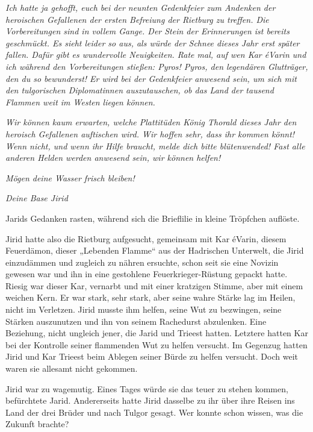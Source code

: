 \textit{Ich hatte ja gehofft, euch bei der neunten Gedenkfeier zum Andenken der heroischen Gefallenen der ersten Befreiung der Rietburg zu treffen. Die Vorbereitungen sind in vollem Gange. Der Stein der Erinnerungen ist bereits geschmückt. Es sieht leider so aus, als würde der Schnee dieses Jahr erst später fallen. Dafür gibt es wundervolle Neuigkeiten. Rate mal, auf wen Kar éVarin und ich während den Vorbereitungen stießen: Pyros! Pyros, den legendären Glutträger, den du so bewunderst! Er wird bei der Gedenkfeier anwesend sein, um sich mit den tulgorischen Diplomatinnen auszutauschen, ob das Land der tausend Flammen weit im Westen liegen können.}

\textit{Wir können kaum erwarten, welche Plattitüden König Thorald dieses Jahr den heroisch Gefallenen auftischen wird. Wir hoffen sehr, dass ihr kommen könnt! Wenn nicht, und wenn ihr Hilfe braucht, melde dich bitte blütenwended! Fast alle anderen Helden werden anwesend sein, wir können helfen!}



\textit{Mögen deine Wasser frisch bleiben!}

\textit{Deine Base Jirid}\bigskip



Jarids Gedanken rasten, während sich die Brieflilie in kleine Tröpfchen auflöste.

Jirid hatte also die Rietburg aufgesucht, gemeinsam mit Kar éVarin, diesem Feuerdämon, dieser „Lebenden Flamme“ aus der Hadrischen Unterwelt, die Jirid einzudämmen und zugleich zu nähren ersuchte, schon seit sie eine Novizin gewesen war und ihn in eine gestohlene Feuerkrieger-Rüstung gepackt hatte. Riesig war dieser Kar, vernarbt und mit einer kratzigen Stimme, aber mit einem weichen Kern. Er war stark, sehr stark, aber seine wahre Stärke lag im Heilen, nicht im Verletzen. Jirid musste ihm helfen, seine Wut zu bezwingen, seine Stärken auszunutzen und ihn von seinem Rachedurst abzulenken. Eine Beziehung, nicht ungleich jener, die Jarid und Trieest hatten. Letztere hatten Kar bei der Kontrolle seiner flammenden Wut zu helfen versucht. Im Gegenzug hatten Jirid und Kar Trieest beim Ablegen seiner Bürde zu helfen versucht. Doch weit waren sie allesamt nicht gekommen.

Jirid war zu wagemutig. Eines Tages würde sie das teuer zu stehen kommen, befürchtete Jarid. Andererseits hatte Jirid dasselbe zu ihr über ihre Reisen ins Land der drei Brüder und nach Tulgor gesagt. Wer konnte schon wissen, was die Zukunft brachte?

